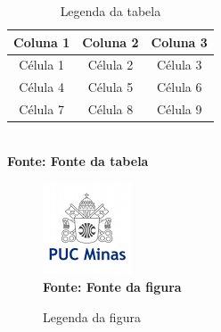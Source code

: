 \begin{table}[!htb]
	\caption[Descrição na Lista de Tabelas]{Legenda da tabela}
	\centering
	\label{tab:tabela}
	\begin{tabular}{c|c|c}
		\hline
		Coluna 1 & Coluna 2 & Coluna 3 \\
		\hline
 		Célula 1 & Célula 2 & Célula 3 \\
		Célula 4 & Célula 5 & Célula 6 \\
		Célula 7 & Célula 8 & Célula 9 \\
		\hline
	\end{tabular}
	\\ \textbf{\footnotesize Fonte: Fonte da tabela}
\end{table}


\begin{figure}[!htb]
   \caption[Descrição na Lista de Figuras]{Legenda da figura}
   \label{fig:figura1}
   \centering
   \includegraphics{LogoPUC.jpg}
   \\ \textbf{\footnotesize Fonte: Fonte da figura}
\end{figure}
